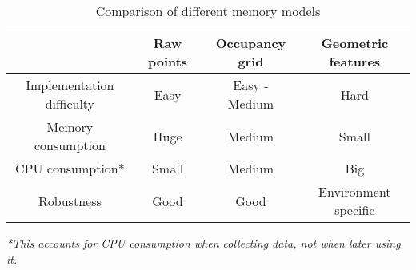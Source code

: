 \documentclass[12pt, a4paper, onecolumn]{article}
\begin{document}
\begin{table}[h!]
  \begin{center}
    \begin{tabular}[c]{|c | c c c|}
      \hline
       & Raw points & Occupancy grid & Geometric features \\
      \hline
      Implementation difficulty & Easy & Easy - Medium & Hard \\
      \hline
      Memory consumption & Huge & Medium & Small \\
      \hline
      CPU consumption* & Small & Medium & Big \\
      \hline
      Robustness & Good & Good & Environment specific \\
      
      \hline
    \end{tabular}
  \end{center}
  \caption{Comparison of different memory models}
  \label{tab:memory_models}
\end{table}
\textit{*This accounts for CPU consumption when collecting data, not when later using it.}


\end{document}
